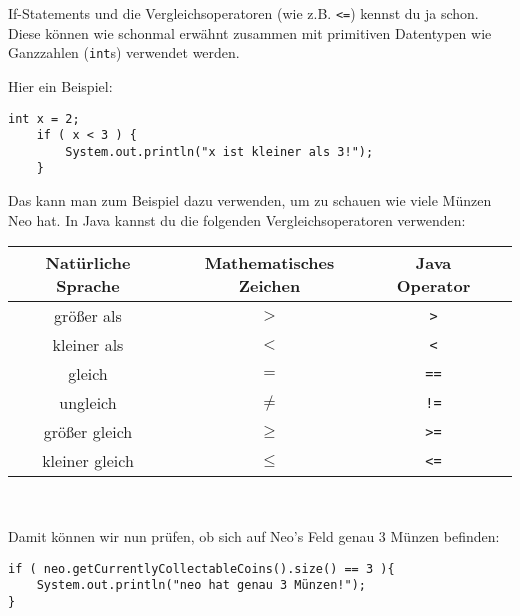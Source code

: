 \begin{Infobox}[If-Statements 2]

	If-Statements und die Vergleichsoperatoren (wie z.B. \lstinline{<=}) kennst du ja schon.
	Diese können wie schonmal erwähnt zusammen mit primitiven Datentypen wie Ganzzahlen (\lstinline{int}s) verwendet werden.\newline

	Hier ein Beispiel:

	\begin{lstlisting}[numbers=none]
	int x = 2;
	if ( x < 3 ) {
		System.out.println("x ist kleiner als 3!");
	}
	\end{lstlisting}

	Das kann man zum Beispiel dazu verwenden, um zu schauen wie viele Münzen Neo hat.
	In Java kannst du die folgenden Vergleichsoperatoren verwenden:

	\begin{center}
		\begin{tabular}{ c | c | c | l }
			Natürliche Sprache & Mathematisches Zeichen & Java Operator \\
			\hline
			größer als & $>$ & \texttt{>} \\
			kleiner als & $<$ & \texttt{<} \\
			gleich & $=$ & \texttt{==}\\
			ungleich & $\neq$ & \texttt{!=} \\
			größer gleich & $\geq$ & \texttt{>=} \\
			kleiner gleich & $\leq$ & \texttt{<=} \\
        \end{tabular} \\
	\end{center}

	Damit können wir nun prüfen, ob sich auf Neo's Feld genau 3 Münzen befinden:

	\begin{lstlisting}[numbers=none]
if ( neo.getCurrentlyCollectableCoins().size() == 3 ){
	System.out.println("neo hat genau 3 Münzen!");
}
	\end{lstlisting}
\end{Infobox}


